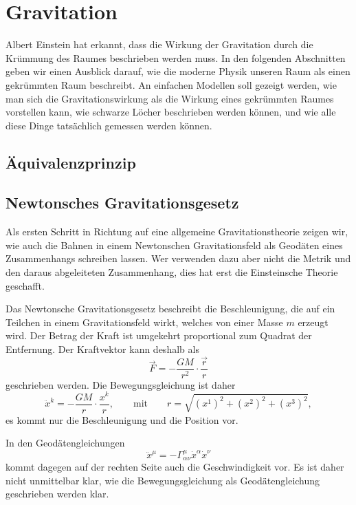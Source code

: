 %
%
%
\chapter{Gravitation%
\label{skript:kruemmusng:sectipn:gravitation}}
\rhead{}
Albert Einstein hat erkannt, dass die Wirkung der Gravitation 
durch die Krümmung des Raumes beschrieben werden muss.
In den folgenden Abschnitten geben wir einen Ausblick darauf, wie
die moderne Physik unseren Raum als einen gekrümmten Raum beschreibt.
An einfachen Modellen soll gezeigt werden, wie man sich die Gravitationswirkung
als die Wirkung eines gekrümmten Raumes vorstellen kann, wie schwarze Löcher
beschrieben werden können, und wie alle diese Dinge tatsächlich gemessen
werden können.

\section{Äquivalenzprinzip}

\section{Newtonsches Gravitationsgesetz}
Als ersten Schritt in Richtung auf eine allgemeine Gravitationstheorie
zeigen wir, wie auch die Bahnen in einem Newtonschen Gravitationsfeld 
als Geodäten eines Zusammenhangs schreiben lassen.
Wer verwenden dazu aber nicht die Metrik und den daraus abgeleiteten 
Zusammenhang, dies hat erst die Einsteinsche Theorie geschafft.

Das Newtonsche Gravitationsgesetz beschreibt die Beschleunigung, die
auf ein Teilchen in einem Gravitationsfeld wirkt, welches von einer
Masse $m$ erzeugt wird.
Der Betrag der Kraft ist umgekehrt proportional zum Quadrat der
Entfernung.
Der Kraftvektor kann deshalb als
\[
\vec F = -\frac{GM}{r^2}\cdot\frac{\vec r}{r}
\]
geschrieben werden.
Die Bewegungsgleichung ist daher 
\begin{equation}
\ddot x^k = -\frac{GM}{r}\cdot\frac{x^k}{r},
\qquad\text{mit}\qquad r = \sqrt{(x^1)^2+(x^2)^2+(x^3)^2},
\label{skript:gravitation:bewegungsgleichung}
\end{equation}
es kommt nur die Beschleunigung und die Position vor.

In den Geodätengleichungen 
\[
\ddot x^\mu = -\Gamma^\mu_{\alpha\nu}\dot x^\alpha\dot x^\nu
\]
kommt dagegen auf der rechten Seite auch die Geschwindigkeit vor.
Es ist daher nicht unmittelbar klar, wie die Bewegungsgleichung als
Geodätengleichung geschrieben werden klar.


